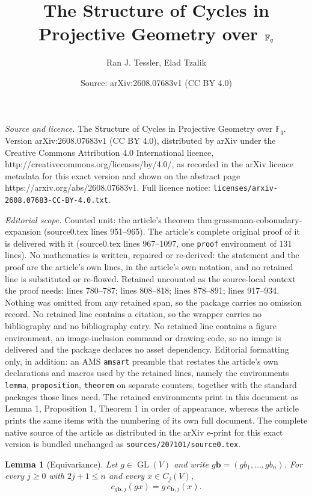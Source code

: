 \documentclass[10pt,a4paper]{amsart}
\title{The Structure of Cycles in Projective Geometry over $\F_q$}
\author{Ran J. Tessler, Elad Tzalik}
\date{Source: arXiv:2608.07683v1 (CC BY 4.0)}
\newcommand{\F}{\mathbb F}
\newtheorem{lemma}{Lemma}
\begin{document}
\maketitle

\noindent\emph{Source and licence.} The Structure of Cycles in Projective Geometry over $\F_q$. Version arXiv:2608.07683v1 (CC BY 4.0), distributed by arXiv under the Creative Commons Attribution 4.0 International licence, http://creativecommons.org/licenses/by/4.0/, as recorded in the arXiv licence metadata for this exact version and shown on the abstract page https://arxiv.org/abs/2608.07683v1. Full licence notice: \texttt{licenses/arxiv-2608.07683-CC-BY-4.0.txt}.\par\smallskip

\noindent\textit{Editorial scope.} Counted unit: the article's theorem thm:grassmann-coboundary-expansion (source0.tex lines 951--965). The article's complete original proof of it is delivered with it (source0.tex lines 967--1097, one \texttt{proof} environment of 131 lines). No mathematics is written, repaired or re-derived: the statement and the proof are the article's own lines, in the article's own notation, and no retained line is substituted or re-flowed.  Retained uncounted as the source-local context the proof needs: lines 780--787; lines 808--818; lines 878--891; lines 917--934.  Nothing was omitted from any retained span, so the package carries no omission record.  No retained line contains a citation, so the wrapper carries no bibliography and no bibliography entry.  No retained line contains a figure environment, an image-inclusion command or drawing code, so no image is delivered and the package declares no asset dependency.  Editorial formatting only, in addition: an AMS \texttt{amsart} preamble that restates the article's own declarations and macros used by the retained lines, namely the environments \texttt{lemma}, \texttt{proposition}, \texttt{theorem} on separate counters, together with the standard packages those lines need.  The retained environments print in this document as Lemma 1, Proposition 1, Theorem 1 in order of appearance, whereas the article prints the same items with the numbering of its own full document.  The complete native source of the article as distributed in the arXiv e-print for this exact version is bundled unchanged as \texttt{sources/207101/source0.tex}.
\begin{lemma}[Equivariance]\label{lem:cone-equivariance}
Let $g\in\operatorname{GL}(V)$ and write
$g\mathbf b=(gb_1,\ldots,gb_n)$. For every $j\ge0$ with
$2j+1\le n$ and every $x\in C_j(V)$,
\[
 c_{g\mathbf b,j}(gx)=g\,c_{\mathbf b,j}(x).
\]
\end{lemma}
\end{document}
